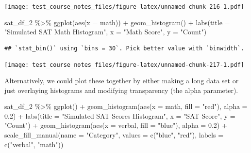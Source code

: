 \documentclass[
]{book}
\newenvironment{Shaded}{\begin{snugshade}}{\end{snugshade}}
\newcommand{\AttributeTok}[1]{\textcolor[rgb]{0.77,0.63,0.00}{#1}}
\newcommand{\FloatTok}[1]{\textcolor[rgb]{0.00,0.00,0.81}{#1}}
\newcommand{\FunctionTok}[1]{\textcolor[rgb]{0.00,0.00,0.00}{#1}}
\newcommand{\NormalTok}[1]{#1}
\newcommand{\SpecialCharTok}[1]{\textcolor[rgb]{0.00,0.00,0.00}{#1}}
\newcommand{\StringTok}[1]{\textcolor[rgb]{0.31,0.60,0.02}{#1}}
\begin{document}
\texttt{[image: test\_course\_notes\_files/figure-latex/unnamed-chunk-216-1.pdf]}

\begin{Shaded}
\begin{Highlighting}[]
\NormalTok{sat\_df\_2 }\SpecialCharTok{\%\textgreater{}\%} \FunctionTok{ggplot}\NormalTok{(}\FunctionTok{aes}\NormalTok{(}\AttributeTok{x =}\NormalTok{ math)) }\SpecialCharTok{+}
  \FunctionTok{geom\_histogram}\NormalTok{() }\SpecialCharTok{+}
  \FunctionTok{labs}\NormalTok{(}\AttributeTok{title =} \StringTok{"Simulated SAT Math Histogram"}\NormalTok{,}
       \AttributeTok{x =} \StringTok{"Math Score"}\NormalTok{,}
       \AttributeTok{y =} \StringTok{"Count"}\NormalTok{)}
\end{Highlighting}
\end{Shaded}

\begin{verbatim}
## `stat_bin()` using `bins = 30`. Pick better value with `binwidth`.
\end{verbatim}

\texttt{[image: test\_course\_notes\_files/figure-latex/unnamed-chunk-217-1.pdf]}

Alternatively, we could plot these together by either making a long data set or just overlaying histograms and modifying transparency (the alpha parameter).

\begin{Shaded}
\begin{Highlighting}[]
\NormalTok{sat\_df\_2 }\SpecialCharTok{\%\textgreater{}\%} \FunctionTok{ggplot}\NormalTok{() }\SpecialCharTok{+}
  \FunctionTok{geom\_histogram}\NormalTok{(}\FunctionTok{aes}\NormalTok{(}\AttributeTok{x =}\NormalTok{ math, }\AttributeTok{fill =} \StringTok{"red"}\NormalTok{), }\AttributeTok{alpha =} \FloatTok{0.2}\NormalTok{) }\SpecialCharTok{+}
  \FunctionTok{labs}\NormalTok{(}\AttributeTok{title =} \StringTok{"Simulated SAT Scores Histogram"}\NormalTok{,}
       \AttributeTok{x =} \StringTok{"SAT Score"}\NormalTok{,}
       \AttributeTok{y =} \StringTok{"Count"}\NormalTok{) }\SpecialCharTok{+}
  \FunctionTok{geom\_histogram}\NormalTok{(}\FunctionTok{aes}\NormalTok{(}\AttributeTok{x =}\NormalTok{ verbal, }\AttributeTok{fill =} \StringTok{"blue"}\NormalTok{), }\AttributeTok{alpha =} \FloatTok{0.2}\NormalTok{) }\SpecialCharTok{+}
  \FunctionTok{scale\_fill\_manual}\NormalTok{(}\AttributeTok{name =} \StringTok{"Category"}\NormalTok{, }\AttributeTok{values =} \FunctionTok{c}\NormalTok{(}\StringTok{"blue"}\NormalTok{, }\StringTok{"red"}\NormalTok{), }\AttributeTok{labels =} \FunctionTok{c}\NormalTok{(}\StringTok{"verbal"}\NormalTok{, }\StringTok{"math"}\NormalTok{))}
\end{Highlighting}
\end{Shaded}
\end{document}
